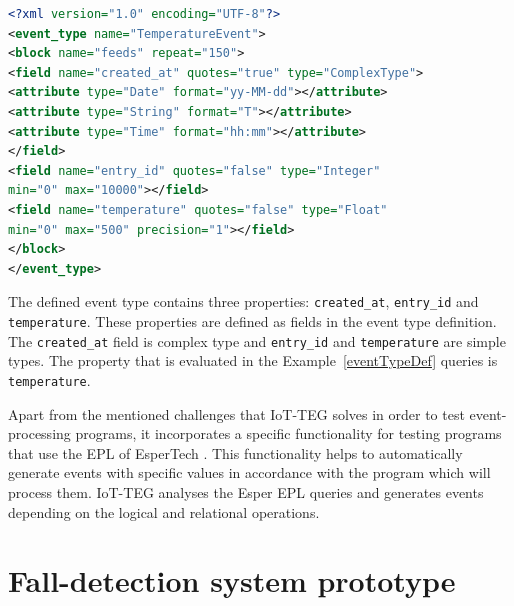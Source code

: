 \documentclass[review]{elsarticle}
\begin{document}
\begin{lstlisting}[basicstyle=\ttfamily\footnotesize,language=XML,caption=Event type definition example,label=eventTypeDef]
<?xml version="1.0" encoding="UTF-8"?>
<event_type name="TemperatureEvent">
<block name="feeds" repeat="150">
<field name="created_at" quotes="true" type="ComplexType">
<attribute type="Date" format="yy-MM-dd"></attribute>
<attribute type="String" format="T"></attribute>
<attribute type="Time" format="hh:mm"></attribute>
</field>
<field name="entry_id" quotes="false" type="Integer" 
min="0" max="10000"></field>
<field name="temperature" quotes="false" type="Float" 
min="0" max="500" precision="1"></field>
</block>
</event_type>
\end{lstlisting}

The defined event type contains three properties: \texttt{created\_at},
\texttt{entry\_id} and \texttt{temperature}. These properties are defined as
fields in the event type definition. The \texttt{created\_at} field is complex
type and \texttt{entry\_id} and \texttt{temperature} are simple types. The
property that is evaluated in the Example~\ref{eventTypeDef} queries is
\texttt{temperature}.

Apart from the mentioned challenges that IoT-TEG solves in order to test 
event-processing programs, it incorporates a specific functionality
for testing programs that use the EPL of EsperTech \cite{Esper:2016}. This functionality helps to 
automatically generate events with specific values in accordance with the 
program which will process them. IoT-TEG analyses the Esper EPL queries and 
generates events depending on the logical and relational operations. 

\section{Fall-detection system prototype}
\label{sec:fall-detectionPrototype}	
\end{document}
